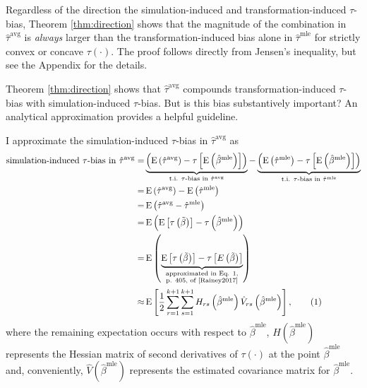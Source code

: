 \documentclass[12pt]{article}
\newcommand\numberthis{\addtocounter{equation}{1}\tag{\theequation}}
\DeclareMathOperator*{\E}{\text{E}}
\begin{document}
\noindent Regardless of the direction the simulation-induced and transformation-induced $\tau$-bias, Theorem \ref{thm:direction} shows that the magnitude of the combination in $\hat{\tau}^{\text{avg}}$ is \textit{always} larger than the transformation-induced bias alone in  $\hat{\tau}^{\text{mle}}$ for strictly convex or concave $\tau(\cdot)$. The proof follows directly from Jensen's inequality, but see the Appendix for the details.

Theorem \ref{thm:direction} shows that $\hat{\tau}^\text{avg}$ compounds transformation-induced $\tau$-bias with simulation-induced $\tau$-bias. But is this bias substantively important? An analytical approximation provides a helpful guideline.

I approximate the simulation-induced $\tau$-bias in $\hat{\tau}^\text{avg}$ as
\begin{align*}
\text{simulation-induced $\tau$-bias in } \hat{\tau}^\text{avg} =& \underbrace{\left( \E \left( \hat{\tau}^\text{avg}\right) - \tau \left[\E \left( \hat{\beta}^\text{mle} \right) \right] \right) }_{\text{t.i. } \tau\text{-bias in }\hat{\tau}^{\text{avg}}} - \underbrace{ \left( \E \left( \hat{\tau}^\text{mle}\right) -  \tau \left[\E \left( \hat{\beta}^\text{mle} \right) \right] \right)}_{\text{t.i. } \tau\text{-bias in }\hat{\tau}^{\text{mle}}}\\
=& \E \left( \hat{\tau}^\text{avg}\right) - \E \left( \hat{\tau}^\text{mle}\right)\\
=& \E \left( \hat{\tau}^\text{avg} - \hat{\tau}^\text{mle} \right)\\
=& \E \left(     \E \left[ \tau\left( \tilde{\beta} \right) \right]      -      \tau \left( \hat{\beta}^\text{mle} \right)     \right)\\
=& \E \left(     \underbrace{\E \left[ \tau\left( \tilde{\beta} \right) \right]      -      \tau \left[ E\left(  \tilde{\beta} \right)\right]}_{\substack{\text{approximated in Eq. 1,} \\ \text{p. 405, of \cite{Rainey2017}}}}   \right)\\
\approx & \E \left[ \dfrac{1}{2} \displaystyle \sum_{r = 1}^{k+1} \sum_{s = 1}^{k+1} H_{rs}\left( \hat{\beta}^\text{mle} \right) \hat{V}_{rs} \left( \hat{\beta}^{\text{mle}} \right) \right], \numberthis \label{eqn:avg-approx}
\end{align*}
where the remaining expectation occurs with respect to $\hat{\beta}^\text{mle}$, $H\left( \hat{\beta}^\text{mle} \right)$ represents the Hessian matrix of second derivatives of $\tau(\cdot)$ at the point $\hat{\beta}^\text{mle}$ and, conveniently, $\hat{V} \left( \hat{\beta}^{\text{mle}} \right)$ represents the estimated covariance matrix for $\hat{\beta}^\text{mle}$.
\end{document}
